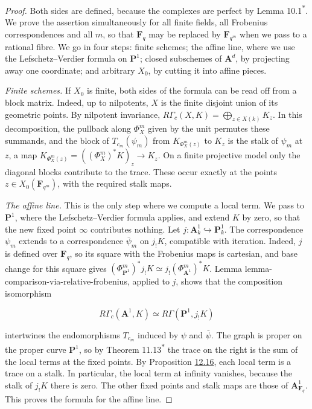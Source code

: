 \documentclass[11pt]{article}
\newcommand{\bpout}[1]{#1\textsuperscript{\hyperlink{bp-outside}{\ensuremath{\ast}}}}
\begin{document}
\begin{proof}[{Proof}]\label{bp63}%
Both sides are defined, because the complexes are perfect by Lemma \bpout{10.1}. We prove the assertion simultaneously for all finite fields, all Frobenius correspondences and all \(m\), so that \(\mathbf F_q\) may be replaced by \(\mathbf F_{q^m}\) when we pass to a rational fibre. We go in four steps: finite schemes; the affine line, where we use the Lefschetz–Verdier formula on \(\mathbf P^1\); closed subschemes of \(\mathbf A^d\), by projecting away one coordinate; and arbitrary \(X_0\), by cutting it into affine pieces.

\emph{Finite schemes.} If \(X_0\) is finite, both sides of the formula can be read off from a block matrix. Indeed, up to nilpotents, \(X\) is the finite disjoint union of its geometric points. By nilpotent invariance, \(R\Gamma_c(X,K)=\bigoplus_{z\in X(k)}K_z\). In this decomposition, the pullback along \(\Phi_X^m\) given by the unit permutes these summands, and the block of \(T_{c_m}(\psi_m)\) from \(K_{\Phi_X^m(z)}\) to \(K_z\) is the stalk of \(\psi_m\) at \(z\), a map \(K_{\Phi_X^m(z)}=((\Phi_X^m)^*K)_z\to K_z\). On a finite projective model only the diagonal blocks contribute to the trace. These occur exactly at the points \(z\in X_0(\mathbf F_{q^m})\), with the required stalk maps.

\emph{The affine line.} This is the only step where we compute a local term. We pass to \(\mathbf P^1\), where the Lefschetz–Verdier formula applies, and extend \(K\) by zero, so that the new fixed point \(\infty\) contributes nothing. Let \(j:\mathbf A^1_k\hookrightarrow\mathbf P^1_k\). The correspondence \(\psi_m\) extends to a correspondence \(\bar\psi_m\) on \(j_!K\), compatible with iteration. Indeed, \(j\) is defined over \(\mathbf F_q\), so its square with the Frobenius maps is cartesian, and base change for this square gives \((\Phi_{\mathbf P^1}^m)^*j_!K\simeq j_!(\Phi_{\mathbf A^1}^m)^*K\). Lemma lemma-comparison-via-relative-frobenius, applied to \(j\), shows that the composition isomorphism

\[
R\Gamma_c(\mathbf A^1,K)
\simeq R\Gamma(\mathbf P^1,j_!K)
\]

intertwines the endomorphisms \(T_{c_m}\) induced by \(\psi\) and \(\bar\psi\). The graph is proper on the proper curve \(\mathbf P^1\), so by Theorem \bpout{11.13} the trace on the right is the sum of the local terms at the fixed points. By Proposition \hyperref[bp49]{12.16}, each local term is a trace on a stalk. In particular, the local term at infinity vanishes, because the stalk of \(j_!K\) there is zero. The other fixed points and stalk maps are those of \(\mathbf A^1_{\mathbf F_q}\). This proves the formula for the affine line.


\end{proof}
\end{document}
